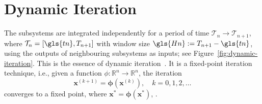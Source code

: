 \section{Dynamic Iteration} \label{sec:dynamic-iteration}
The subsystems are integrated independently for a period of time $\mathcal{T}_n \rightarrow \mathcal{T}_{n+1}$, where $\mathcal{T}_n = [\gls{tn}, T_{n+1}]$ with window size $\gls{Hn} := T_{n+1} - \gls{tn}$, using the outputs of neighbouring subsystems as inputs; see Figure~\ref{fig:dynamic-iteration}. This is the essence of dynamic iteration~\cite{Gomes2017}. It is a fixed-point iteration technique, i.e., given a function $\phi: \mathbb{R}^n \to \mathbb{R}^n$, the iteration
\begin{equation*}
	\mathbf{x}^{(k+1)} = \mathbf{\phi}(\mathbf{x}^{(k)}), \quad k=0,1,2,\dots
\end{equation*}
converges to a fixed point, where $\mathbf{x}^* = \mathbf{\phi}(\mathbf{x}^*)$, \cite{Dahmen2008}.

